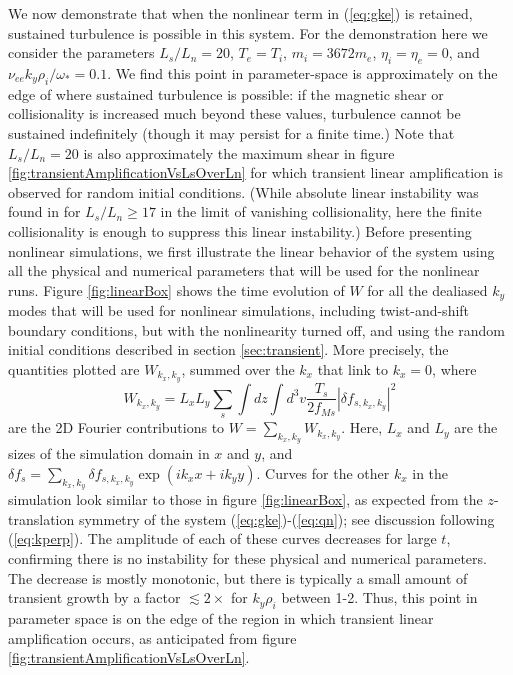 \documentclass[12pt,superscriptaddress]{revtex4}
\newcommand{\omegase}{\omega_{*}}
\begin{document}
We now demonstrate that when the nonlinear term in (\ref{eq:gke})
is retained, sustained turbulence is possible
in this system.
For the demonstration here we consider
the parameters $L_s/L_n = 20$, $T_e = T_i$, $m_i = 3672 m_e$, $\eta_i = \eta_e = 0$, and $\nu_{ee} k_y \rho_i / \omegase = 0.1$.
We find this point in parameter-space is approximately on the edge of where sustained turbulence
is possible: if the magnetic shear or collisionality is increased much beyond these values,
turbulence cannot be sustained indefinitely (though it may persist for a finite time.)
Note that $L_s/L_n=20$ is also approximately the maximum shear
in figure \ref{fig:transientAmplificationVsLsOverLn} for which transient linear amplification is observed
for random initial conditions.
(While absolute linear instability was found in \cite{usUniversalInstability} for $L_s/L_n \ge 17$ in the limit of vanishing collisionality, here the finite collisionality is enough to suppress this linear instability.)
Before presenting nonlinear simulations,
we first illustrate the linear behavior of the system using all the physical and numerical
parameters that will be used for the nonlinear runs.  Figure \ref{fig:linearBox} shows the time evolution of
$W$ for all the dealiased $k_y$ modes that will be
used for nonlinear simulations, including twist-and-shift boundary conditions,
but with the nonlinearity turned off, and
using the random initial conditions described in section \ref{sec:transient}.
More precisely, the quantities plotted are $W_{k_x,k_y}$, summed over the $k_x$ that link to $k_x=0$, where
\begin{equation}
\label{eq:Wk}
W_{k_x,k_y} = L_x L_y \sum_s \int dz \int d^3v \frac{T_s}{2 f_{Ms}}\left|\delta\! f_{s,k_x,k_y}\right|^2
\end{equation}
are the 2D Fourier contributions to $W = \sum_{k_x,k_y} W_{k_x,k_y}$.
Here,
$L_x$ and $L_y$ are the sizes of the simulation domain in $x$ and $y$,
and $\delta\! f_s =\sum_{k_x,k_y} \delta\! f_{s,k_x,k_y} \exp( i k_x x+i k_y y)$.
Curves for the other $k_x$ in the simulation look similar to those in figure \ref{fig:linearBox},
as expected from the $z$-translation symmetry of the system (\ref{eq:gke})-(\ref{eq:qn}); see discussion following (\ref{eq:kperp}).
The amplitude of each
of these curves decreases for large $t$, confirming there is no instability for these physical and
numerical parameters.  The decrease is mostly monotonic, but there is typically a small
amount of transient growth by a factor $ \lesssim 2\times$ for $k_y \rho_i$ between 1-2.
Thus, this point in parameter space is on the edge of the region in which transient linear
amplification occurs, as anticipated from figure \ref{fig:transientAmplificationVsLsOverLn}.
\end{document}
